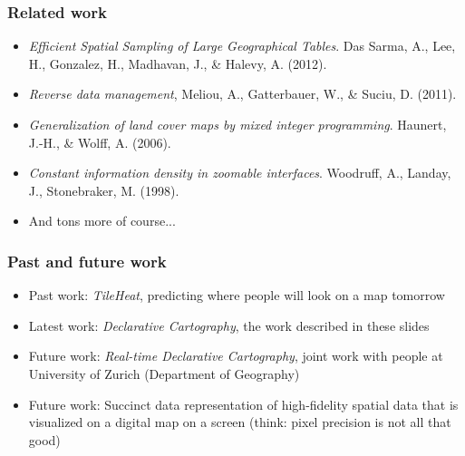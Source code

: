 \documentclass{beamer}
\begin{document}
\frame
{
  \frametitle{Related work}

  \begin{itemize}
  \item \emph{Efficient Spatial Sampling of Large Geographical Tables}. Das Sarma, A., Lee, H., Gonzalez, H., Madhavan, J., \& Halevy, A. (2012).
  \item \emph{Reverse data management}, Meliou, A., Gatterbauer, W., \& Suciu, D. (2011).
  \item \emph{Generalization of land cover maps by mixed integer programming}. Haunert, J.-H., \& Wolff, A. (2006). 
  \item \emph{Constant information density in zoomable interfaces}. Woodruff, A., Landay, J., Stonebraker, M. (1998).
  \item And tons more of course...
  \end{itemize}
}

\frame
{
  \frametitle{Past and future work}

  \begin{itemize}
  \item Past work: \emph{TileHeat}, predicting where people will look on a map tomorrow
  \item Latest work: \emph{Declarative Cartography}, the work described in these slides
  \item Future work: \emph{Real-time Declarative Cartography}, joint work with people at University of Zurich (Department of Geography)
  \item Future work: Succinct data representation of high-fidelity spatial data that is visualized on a digital map on a screen (think: pixel precision is not all that good)
  \end{itemize}
}
\end{document}
